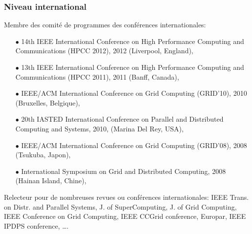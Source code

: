 \documentclass[11pt]{article}
\begin{document}
\subsubsection{Niveau international}
Membre des comité de programmes des conférences internationales:\\[-3mm]
\begin{itemize}
\item[$\bullet$] 
14th IEEE International Conference on High Performance Computing and Communications (HPCC 2012), 
2012 (Liverpool, England),
\item[$\bullet$] 
13th IEEE International Conference on High Performance Computing and Communications (HPCC 2011), 
2011 (Banff, Canada),
\item[$\bullet$] 
IEEE/ACM International Conference on Grid Computing (GRID'10), 2010 (Bruxelles, Belgique),
\item[$\bullet$] 
20th IASTED International Conference on Parallel and Distributed Computing and Systems, 2010, (Marina Del Rey, USA),
\item[$\bullet$] 
IEEE/ACM International Conference on Grid Computing (GRID'08), 2008 (Tsukuba, Japon), 
\item [$\bullet$]
International Symposium on Grid and Distributed Computing, 2008 (Hainan Island, Chine),\\
\end{itemize}

Relecteur pour de nombreuses revues ou conférences internationales: IEEE Trans. on Distr. and Parallel Systems, 
J. of SuperComputing, J. of Grid Computing, IEEE Conference on Grid Computing, IEEE CCGrid conference, Europar,
IEEE IPDPS conference, \ldots.
\end{document}
